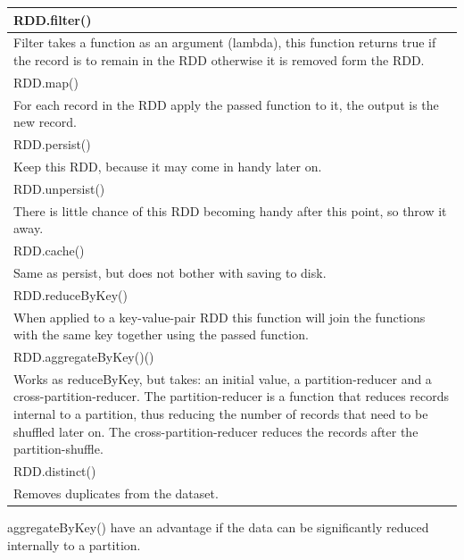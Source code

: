 \documentclass[abstract=on]{article}
\begin{document}
\begin{center}
\begin{tabularx}{0.75\textwidth}{ |X| }
\hline
\cellcolor[gray]{0.9}
RDD.filter() \\ \hline
Filter takes a function as an argument (lambda), this function returns true
if the record is to remain in the RDD otherwise it is removed form the RDD.
\\ \hline
\hline
\cellcolor[gray]{0.9}
RDD.map() \\ \hline
For each record in the RDD apply the passed function to it, the output is the
 new record.
\\ \hline
\hline
\cellcolor[gray]{0.9}
RDD.persist() \\ \hline
Keep this RDD, because it may come in handy later on.
\\ \hline
\hline
\cellcolor[gray]{0.9}
RDD.unpersist() \\ \hline
There is little chance of this RDD becoming handy after this point, so throw it
away.
\\ \hline
\hline
\cellcolor[gray]{0.9}
RDD.cache() \\ \hline
Same as persist, but does not bother with saving to disk.
\\ \hline
\hline
\cellcolor[gray]{0.9}
RDD.reduceByKey() \\ \hline
When applied to a key-value-pair RDD this function will join the functions with
the same key together using the passed
function.
\\ \hline
\hline
\cellcolor[gray]{0.9}
RDD.aggregateByKey()() \\ \hline
Works as reduceByKey, but takes: an initial value, a partition-reducer and a
cross-partition-reducer. The partition-reducer is a function that reduces
records internal to a partition, thus reducing the number of records that need
to be shuffled later on. The cross-partition-reducer reduces the records after
the partition-shuffle.
\\ \hline
\hline
\cellcolor[gray]{0.9}
RDD.distinct() \\ \hline
Removes duplicates from the dataset.
\\ \hline
\end{tabularx}

\end{center}
aggregateByKey() have an advantage if the data can be significantly reduced internally to a partition.
\end{document}
